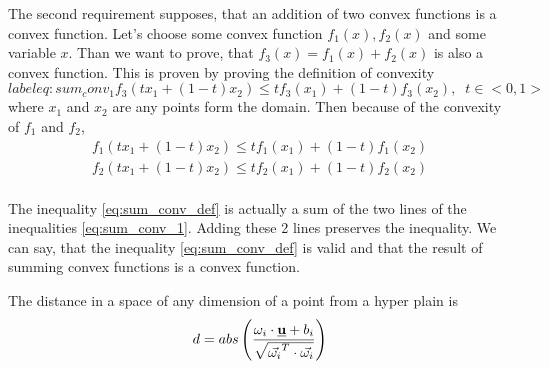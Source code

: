 \documentclass[a4paper,11pt,titlepage]{article}
\newcommand{\uvec}{\textbf{\underline{u}}}
\begin{document}
The second requirement supposes, that an addition of two convex functions is a convex function. Let's choose some convex function $f_1(x), f_2(x)$ and some variable $x$. Than we want to prove, that $f_3(x) = f_1(x) + f_2(x)$ is also a convex function. This is proven by proving the definition of convexity 
\begin{equation}label{eq:sum_conv_1}
\label{eq:sum_conv_def}
f_3(tx_1+(1-t)x_2) \leq tf_3(x_1) + (1-t)f_3(x_2), \;\; t  \in  <0, 1>
\end{equation}
where $x_1$ and $x_2$ are any points form the domain. Then because of the convexity of $f_1$ and $f_2$,
\begin{equation}
\label{eq:sum_conv_1}
\begin{split}
f_1(tx_1+(1-t)x_2) \leq tf_1(x_1) + (1-t)f_1(x_2)\\
f_2(tx_1+(1-t)x_2) \leq tf_2(x_1) + (1-t)f_2(x_2)\\
\end{split}
\end{equation}

The inequality \ref{eq:sum_conv_def} is actually a sum of the two lines of the inequalities \ref{eq:sum_conv_1}. Adding these 2 lines preserves the inequality. We can say, that the inequality \ref{eq:sum_conv_def} is valid and that the result of summing convex functions is a convex function. 

The distance in a space of any dimension of a point from a hyper plain is 
\begin{equation}
\label{eq:plain_distance}
d = abs\left(\frac{\omega_i \cdot \uvec + b_i}{\sqrt{\vec{\omega_i}^T \cdot \vec{\omega_i}}}\right)
\end{equation}
\end{document}
